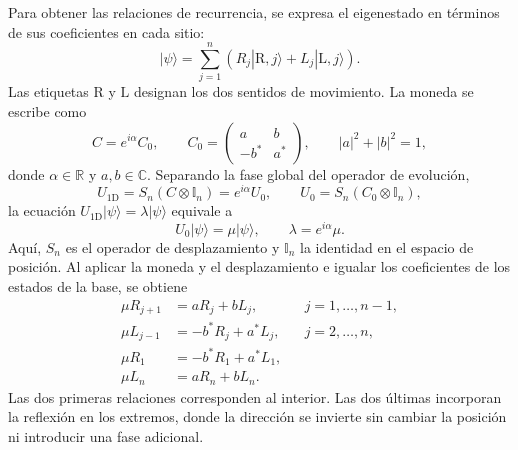 \documentclass[12pt,a4paper,oneside]{report} %
\begin{document}
Para obtener las relaciones de recurrencia, se expresa el eigenestado en términos de sus coeficientes en cada sitio:
\begin{equation}
  |\psi\rangle
  =\sum_{j=1}^{n}
  \left(R_j|\mathrm{R},j\rangle+L_j|\mathrm{L},j\rangle\right).
\end{equation}
Las etiquetas $\mathrm{R}$ y $\mathrm{L}$ designan los dos sentidos de movimiento. La moneda se escribe como
\begin{equation}
  C=e^{i\alpha}C_0,
  \qquad
  C_0=
  \begin{pmatrix}
    a&b\\
    -b^*&a^*
  \end{pmatrix},
  \qquad |a|^2+|b|^2=1,
  \label{eq:moneda-tramo-reflectante}
\end{equation}
donde $\alpha\in\mathbb R$ y $a,b\in\mathbb C$. Separando la fase global del operador de evolución,
\begin{equation}
  U_{\mathrm{1D}}
  =S_n(C\otimes\mathbb I_n)
  =e^{i\alpha}U_0,
  \qquad
  U_0=S_n(C_0\otimes\mathbb I_n),
  \label{eq:aquí}
\end{equation}
la ecuación $U_{\mathrm{1D}}|\psi\rangle=\lambda|\psi\rangle$ equivale a
\begin{equation}
  U_0|\psi\rangle=\mu|\psi\rangle,
  \qquad \lambda=e^{i\alpha}\mu.
\end{equation}
Aquí, $S_n$ es el operador de desplazamiento y $\mathbb I_n$ la identidad en el espacio de posición. Al aplicar la moneda y el desplazamiento e igualar los coeficientes de los estados de la base, se obtiene
\begin{align}
  \mu R_{j+1}&=aR_j+bL_j,
  &&j=1,\ldots,n-1,
  \label{eq:interior-derecha-1d}\\
  \mu L_{j-1}&=-b^*R_j+a^*L_j,
  &&j=2,\ldots,n,
  \label{eq:interior-izquierda-1d}\\
  \mu R_1&=-b^*R_1+a^*L_1,
  \label{eq:frontera-izquierda-1d}\\
  \mu L_n&=aR_n+bL_n.
  \label{eq:frontera-derecha-1d}
\end{align}
Las dos primeras relaciones corresponden al interior. Las dos últimas incorporan la reflexión en los extremos, donde la dirección se invierte sin cambiar la posición ni introducir una fase adicional.
\end{document}
